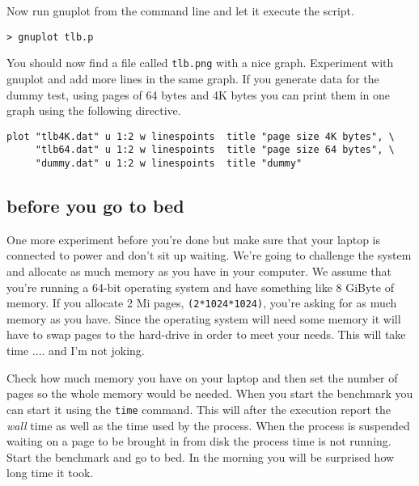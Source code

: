 \documentclass[a4paper,11pt]{article}
\begin{document}
Now run gnuplot from the command line and let it execute the
script.

\begin{verbatim}
> gnuplot tlb.p
\end{verbatim}

You should now find a file called {\tt tlb.png} with a nice
graph. Experiment with gnuplot and add more lines in the same
graph. If you generate data for the dummy test, using pages of 64
bytes and 4K bytes you can print them in one graph using the following
directive.

\begin{lstlisting}
plot "tlb4K.dat" u 1:2 w linespoints  title "page size 4K bytes", \
     "tlb64.dat" u 1:2 w linespoints  title "page size 64 bytes", \
     "dummy.dat" u 1:2 w linespoints  title "dummy"
\end{lstlisting}
   
\subsection{before you go to bed}

One more experiment before you're done but make sure that your laptop
is connected to power and don't sit up waiting. We're going to
challenge the system and allocate as much memory as you have in your
computer. We assume that you're running a 64-bit operating system and
have something like 8 GiByte of memory. If you allocate 2 Mi pages,
{\tt (2*1024*1024)}, you're asking for as much memory as you
have. Since the operating system will need some memory it will have to
swap pages to the hard-drive in order to meet your needs. This will
take time .... and I'm not joking.

Check how much memory you have on your laptop and then set the number
of pages so the whole memory would be needed. When you start the
benchmark you can start it using the {\tt time} command. This will
after the execution report the {\em wall} time as well as the time
used by the process. When the process is suspended waiting on a page
to be brought in from disk the process time is not running. Start the
benchmark and go to bed. In the morning you will be surprised how long
time it took.
\end{document}
